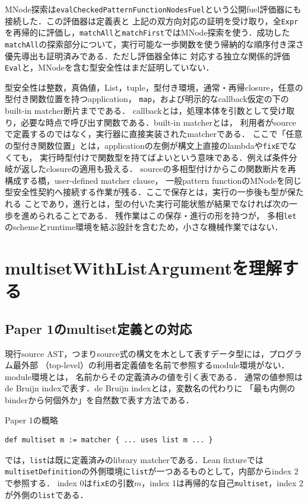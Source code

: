 \documentclass[11pt,a4paper,oneside]{ltjsbook}
\newcommand{\code}[1]{\texttt{#1}}
\begin{document}
MNode探索は\code{evalCheckedPatternFunctionNodesFuel}という公開fuel評価器にも接続した．この評価器は定義表と
上記の双方向対応の証明を受け取り，全\code{Expr}を再帰的に評価し，\code{matchAll}と\code{matchFirst}ではMNode探索を使う．成功した
\code{matchAll}の探索部分について，実行可能な一歩関数を使う帰納的な順序付き深さ優先導出も証明済みである．ただし評価器全体に
対応する独立な関係的評価\code{Eval}と，MNodeを含む型安全性はまだ証明していない．

型安全性は整数，真偽値，List，tuple，型付き環境，通常・再帰closure，任意の型付き関数位置を持つapplication，
\code{map}，および明示的なcallback仮定の下のbuilt-in matcher断片までである．
callbackとは，処理本体を引数として受け取り，必要な時点で呼び出す関数である．built-in matcherとは，
利用者がsourceで定義するのではなく，実行器に直接実装されたmatcherである．
ここで「任意の型付き関数位置」とは，applicationの左側が構文上直接のlambdaや\code{fixE}でなくても，
実行時型付けで関数型を持てばよいという意味である．例えば条件分岐が返したclosureの適用も扱える．
sourceの多相型付けからこの関数断片を再構成する橋，user-defined matcher clause，
一般pattern functionのMNodeを同じ型安全性契約へ接続する作業が残る．ここで保存とは，実行の一歩後も型が保たれる
ことであり，進行とは，型の付いた実行可能状態が結果でなければ次の一歩を進められることである．
残作業はこの保存・進行の形を持つが，
多相\code{let}のschemeとruntime環境を結ぶ設計を含むため，小さな機械作業ではない．

\chapter{multisetWithListArgumentを理解する}

\section{Paper 1のmultiset定義との対応}

現行source AST，つまりsource式の構文を木として表すデータ型には，プログラム最外部
（top-level）の利用者定義値を名前で参照するmodule環境がない．module環境とは，
名前からその定義済みの値を引く表である．
通常の値参照はde Bruijn indexで表す．de Bruijn indexとは，変数名の代わりに
「最も内側のbinderから何個外か」を自然数で表す方法である．

Paper 1の概略
\begin{lstlisting}
def multiset m := matcher { ... uses list m ... }
\end{lstlisting}
では，\code{list}は既に定義済みのlibrary matcherである．Lean fixtureでは
\code{multisetDefinition}の外側環境に\code{list}が一つあるものとして，内部からindex 2で参照する．
index 0は\code{fixE}の引数$m$，index 1は再帰的な自己\code{multiset}，index 2が外側の\code{list}である．
\end{document}
